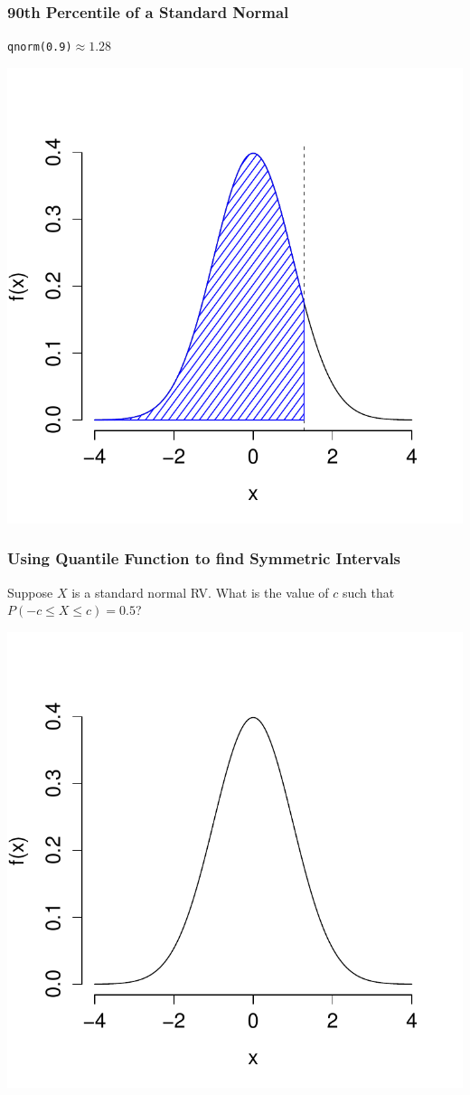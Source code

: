 \documentclass[handout]{beamer}
\begin{document}
\begin{frame}
\frametitle{90th Percentile of a Standard Normal}
\texttt{qnorm(0.9)}$\approx 1.28$
\begin{center}
\includegraphics[scale = 0.6]{./images/normal90}
\end{center}
\end{frame}

\begin{frame}
\frametitle{Using Quantile Function to find Symmetric Intervals}
Suppose $X$ is a standard normal RV. What is the value of $c$ such that $P(-c \leq X\leq c ) = 0.5$?
\begin{center}
\includegraphics[scale = 0.55]{./images/tail1}
\end{center}
\end{frame}
\end{document}
